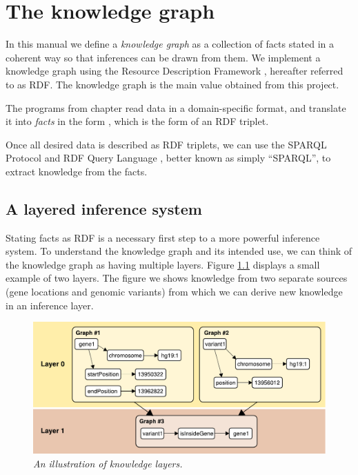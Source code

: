 \chapter{The knowledge graph}
\label{chap:knowledge-graph}

  In this manual we define a \emph{knowledge graph} as a collection of
  facts stated in a coherent way so that inferences can be drawn from
  them.  We implement a knowledge graph using the Resource Description
  Framework \citep{Lassila-99-RDF}, hereafter referred to as RDF.  The
  knowledge graph is the main value obtained from this project.

  The programs from chapter  read data in a
  domain-specific format, and translate it into \emph{facts} in the form
  , which is the form of an RDF triplet.

  Once all desired data is described as RDF triplets, we can use the SPARQL
  Protocol and RDF Query Language \citep{sparql-11}, better known as simply
  ``SPARQL'', to extract knowledge from the facts.

\section{A layered inference system}

  Stating facts as RDF is a necessary first step to a more powerful inference
  system.  To understand the knowledge graph and its intended use, we can
  think of the knowledge graph as having multiple layers.  Figure
  \ref{fig:layered-knowledge} displays a small example of two layers.  The
  figure we shows knowledge from two separate sources (gene locations and
  genomic variants) from which we can derive new knowledge in an inference
  layer.

  \begin{figure}[!htbp]
    \begin{center}
    \includegraphics[width=1.0\textwidth]{figures/layered-knowledge.pdf}
    \end{center}
    \caption{\textit{An illustration of knowledge layers.}}
    \label{fig:layered-knowledge}
  \end{figure}

